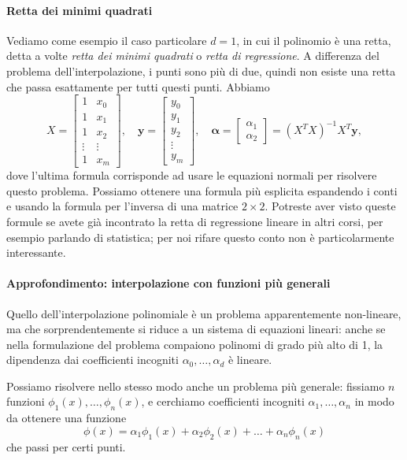 \documentclass[a4paper]{report}
\theoremstyle{definition}
\theoremstyle{remark}
\begin{document}
\paragraph{Retta dei minimi quadrati} Vediamo come esempio il caso particolare $d=1$, in cui il polinomio è una retta, detta a volte \emph{retta dei minimi quadrati} o \emph{retta di regressione}. A differenza del problema dell'interpolazione, i punti sono più di due, quindi non esiste una retta che passa esattamente per tutti questi punti. Abbiamo
\[
X = \begin{bmatrix}
    1 & x_0\\
    1 & x_1\\
    1 & x_2\\
    \vdots & \vdots\\
    1 & x_m
\end{bmatrix}, \quad \mathbf{y} = \begin{bmatrix}
y_0\\
y_1\\
y_2\\
\vdots\\
y_m
\end{bmatrix}, \quad \boldsymbol{\alpha} = \begin{bmatrix}
\alpha_1\\
\alpha_2
\end{bmatrix} = (X^TX)^{-1} X^T \mathbf{y},
\]
dove l'ultima formula corrisponde ad usare le equazioni normali per risolvere questo problema. Possiamo ottenere una formula più esplicita espandendo i conti e usando la formula per l'inversa di una matrice $2\times 2$. Potreste aver visto queste formule se avete già incontrato la retta di regressione lineare in altri corsi, per esempio parlando di statistica; per noi rifare questo conto non è particolarmente interessante.


\paragraph{Approfondimento: interpolazione con funzioni più generali} Quello dell'interpolazione polinomiale è un problema apparentemente non-lineare, ma che sorprendentemente si riduce a un sistema di equazioni lineari: anche se nella formulazione del problema compaiono polinomi di grado più alto di 1, la dipendenza dai coefficienti incogniti $\alpha_0,\dots, \alpha_d$ è lineare. 

Possiamo risolvere nello stesso modo anche un problema più generale: fissiamo $n$ funzioni $\phi_1(x), \dots, \phi_n(x)$, e cerchiamo coefficienti incogniti $\alpha_1,\dots,\alpha_n$ in modo da ottenere una funzione
\begin{equation} \label{phi}
    \phi(x) = \alpha_1 \phi_1(x) + \alpha_2 \phi_2(x) + \dots + \alpha_n \phi_n(x)    
\end{equation}
che passi per certi punti.
\end{document}
